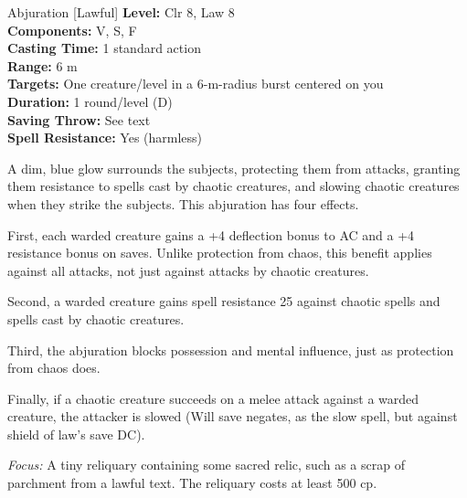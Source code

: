 {Abjuration [Lawful]}
{
	\textbf{Level:}
	Clr 8, Law 8\\
	\textbf{Components:}
	V, S, F\\
	\textbf{Casting Time:}
	1 standard action\\
	\textbf{Range:}
	6 m\\
	\textbf{Targets:}
	One creature/level in a 6-m-radius burst centered on you\\
	\textbf{Duration:}
	1 round/level (D)\\
	\textbf{Saving Throw:}
	See text\\
	\textbf{Spell Resistance:}
	Yes (harmless)\\
}
{
	A dim, blue glow surrounds the subjects, protecting them from attacks, granting them resistance to spells cast by chaotic creatures, and slowing chaotic creatures when they strike the subjects. This abjuration has four effects.

	First, each warded creature gains a +4 deflection bonus to AC and a +4 resistance bonus on saves. Unlike protection from chaos, this benefit applies against all attacks, not just against attacks by chaotic creatures.

	Second, a warded creature gains spell resistance 25 against chaotic spells and spells cast by chaotic creatures.

	Third, the abjuration blocks possession and mental influence, just as protection from chaos does.

	Finally, if a chaotic creature succeeds on a melee attack against a warded creature, the attacker is slowed (Will save negates, as the slow spell, but against shield of law's save DC).

	\textit{Focus:}
	A tiny reliquary containing some sacred relic, such as a scrap of parchment from a lawful text. The reliquary costs at least 500 cp.

}
